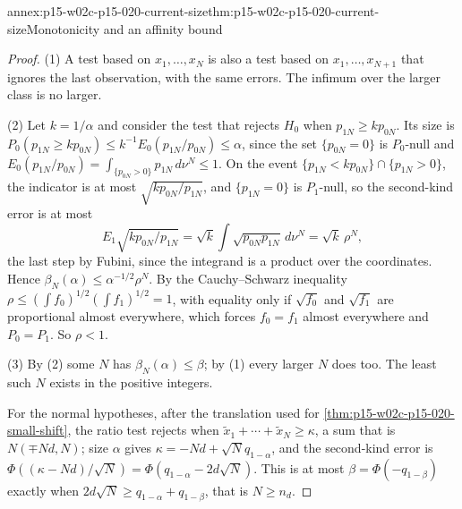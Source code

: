 \begin{annexitem}{annex:p15-w02c-p15-020-current-size}{thm:p15-w02c-p15-020-current-size}{Monotonicity and an affinity bound}
\begin{proof}
(1) A test based on \(x_1,\ldots,x_N\) is also a test based on
\(x_1,\ldots,x_{N+1}\) that ignores the last observation, with the same
errors. The infimum over the larger class is no larger.

(2) Let \(k=1/\alpha\) and consider the test that rejects \(H_0\) when
\(p_{1N}\geq kp_{0N}\). Its size is
\(P_0(p_{1N}\geq kp_{0N})\leq k^{-1}E_0(p_{1N}/p_{0N})\leq\alpha\), since
the set \(\{p_{0N}=0\}\) is \(P_0\)-null and
\(E_0(p_{1N}/p_{0N})=\int_{\{p_{0N}>0\}}p_{1N}\,d\nu^N\leq1\). On the
event \(\{p_{1N}<kp_{0N}\}\cap\{p_{1N}>0\}\), the indicator is at most
\(\sqrt{kp_{0N}/p_{1N}}\), and \(\{p_{1N}=0\}\) is \(P_1\)-null, so the
second-kind error is at most
\[
 E_1\sqrt{kp_{0N}/p_{1N}}=\sqrt k\int\sqrt{p_{0N}p_{1N}}\,d\nu^N=\sqrt k\,\rho^N,
\]
the last step by Fubini, since the integrand is a product over the
coordinates. Hence \(\beta_N(\alpha)\leq\alpha^{-1/2}\rho^N\). By the
Cauchy--Schwarz inequality \(\rho\leq(\int f_0)^{1/2}(\int f_1)^{1/2}=1\),
with equality only if \(\sqrt{f_0}\) and \(\sqrt{f_1}\) are proportional
almost everywhere, which forces \(f_0=f_1\) almost everywhere and
\(P_0=P_1\). So \(\rho<1\).

(3) By (2) some \(N\) has \(\beta_N(\alpha)\leq\beta\); by (1) every
larger \(N\) does too. The least such \(N\) exists in the positive
integers.

For the normal hypotheses, after the translation used for
\cref{thm:p15-w02c-p15-020-small-shift}, the ratio test rejects when
\(\tilde x_1+\cdots+\tilde x_N\geq\kappa\), a sum that is
\(N(\mp Nd,N)\); size \(\alpha\) gives \(\kappa=-Nd+\sqrt Nq_{1-\alpha}\),
and the second-kind error is
\(\Phi((\kappa-Nd)/\sqrt N)=\Phi(q_{1-\alpha}-2d\sqrt N)\). This is at
most \(\beta=\Phi(-q_{1-\beta})\) exactly when
\(2d\sqrt N\geq q_{1-\alpha}+q_{1-\beta}\), that is \(N\geq n_d\).
\end{proof}
\end{annexitem}

